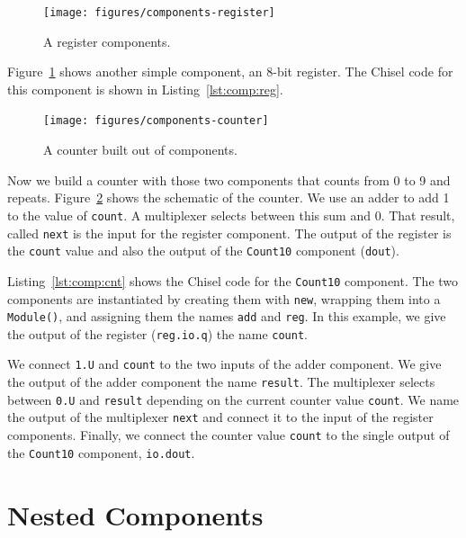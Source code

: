 \documentclass[%
    10pt,
    headinclude, footexclude,
    openright, %
    notitlepage,
    cleardoubleempty,
    headsepline,
    pointlessnumbers,
    bibtotoc, idxtotoc,
    ]{scrbook}
\newcommand{\code}[1]{{\small{\texttt{#1}}}}
\begin{document}
\begin{figure}
  \centering
  \texttt{[image: figures/components-register]}
  \caption{A register components.}
  \label{fig:components-register}
\end{figure}


Figure~\ref{fig:components-register} shows another simple component, an 8-bit register.
The Chisel code for this component is shown in Listing~\ref{lst:comp:reg}.


\begin{figure}
  \centering
  \texttt{[image: figures/components-counter]}
  \caption{A counter built out of components.}
  \label{fig:components-counter}
\end{figure}


Now we build a counter with those two components that counts from 0 to 9 and repeats.
Figure~\ref{fig:components-counter} shows the schematic of the counter. We use an adder
to add 1 to the value of \code{count}. A multiplexer selects between this sum and 0.
That result, called \code{next} is the input for the register component. The output of the
register is the \code{count} value and also the output of the \code{Count10} component (\code{dout}).

Listing~\ref{lst:comp:cnt} shows the Chisel code for the \code{Count10} component.
The two components are instantiated by creating them with \code{new}, wrapping them
into a \code{Module()}, and assigning them the names \code{add} and \code{reg}.
In this example, we give the output of the register (\code{reg.io.q}) the name \code{count}.

We connect \code{1.U} and \code{count} to the two inputs of the adder component.
We give the output of the adder component the name \code{result}.
The multiplexer selects between \code{0.U} and \code{result} depending on the current counter
value \code{count}. We name the output of the multiplexer \code{next} and connect it
to the input of the register components. Finally, we connect the counter value \code{count}
to the single output of the \code{Count10} component, \code{io.dout}.



\section{Nested Components}
\end{document}
